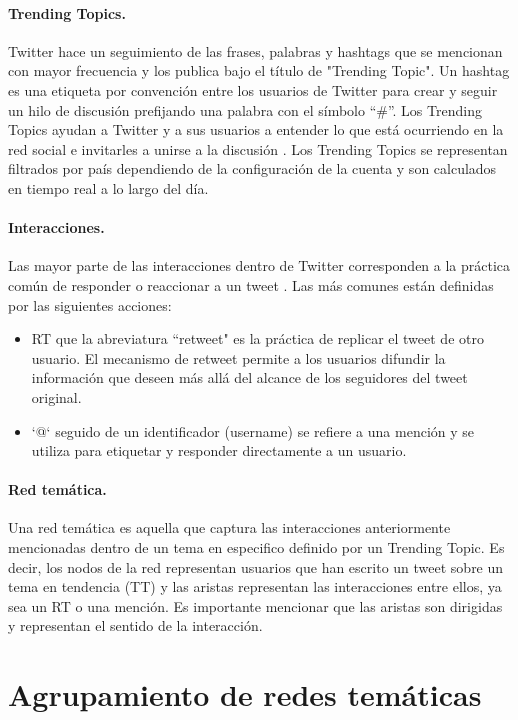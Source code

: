 \paragraph{Trending Topics.}
Twitter hace un seguimiento de las frases, palabras y hashtags que se mencionan con mayor frecuencia y los publica bajo el título de "Trending Topic". Un hashtag es una etiqueta por convención entre los usuarios de Twitter para crear y seguir un hilo de discusión prefijando una palabra con el símbolo “\#”. Los Trending Topics ayudan a Twitter y a sus usuarios a entender lo que está ocurriendo en la red social e invitarles a unirse a la discusión \cite{twitter_twittercom_nodate}. Los Trending Topics se representan filtrados por país dependiendo de la configuración de la cuenta y son calculados en tiempo real a lo largo del día. 

\paragraph{Interacciones.} Las mayor parte de las interacciones dentro de Twitter corresponden a la práctica común de responder o reaccionar a un tweet \cite{kwak_what_2010}. Las más comunes están definidas por las siguientes acciones: 
\begin{itemize}
    \item RT que la abreviatura “retweet" es la práctica de replicar el tweet de otro usuario. El mecanismo de retweet permite a los usuarios difundir la información que deseen más allá del alcance de los seguidores del tweet original.

    \item ‘@‘ seguido de un identificador (username) se refiere a una mención y se utiliza para etiquetar y responder directamente a un usuario.
\end{itemize}

\paragraph{Red temática.} Una red temática es aquella que captura las interacciones anteriormente mencionadas dentro de un tema en especifico definido por un Trending Topic. Es decir, los nodos de la red representan usuarios que han escrito un tweet sobre un tema en tendencia (TT) y las aristas representan las interacciones entre ellos, ya sea un RT o una mención. Es importante mencionar que las aristas son dirigidas y representan el sentido de la interacción.

\section{Agrupamiento de redes temáticas}

